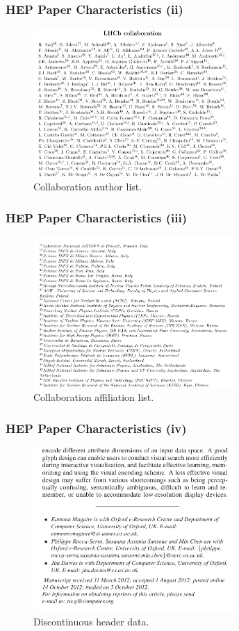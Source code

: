 \documentclass{beamer}
\begin{document}

\begin{frame}
\frametitle{HEP Paper Characteristics (ii)}
\begin{figure}[h]
\center
\includegraphics[width=3in]{Figures/authors.pdf}
\caption{Collaboration author list.}
\end{figure}
\end{frame}


\begin{frame}
\frametitle{HEP Paper Characteristics (iii)}
\begin{figure}[h]
\center
\includegraphics[width=3in]{Figures/affiliations.pdf}
\caption{Collaboration affiliation list.}
\end{figure}
\end{frame}



\begin{frame}
\frametitle{HEP Paper Characteristics (iv)}
\begin{figure}[h]
\center
\includegraphics[width=3in]{Figures/eamonn.pdf}
\caption{Discontinuous header data.}
\end{figure}
\end{frame}
\end{document}
